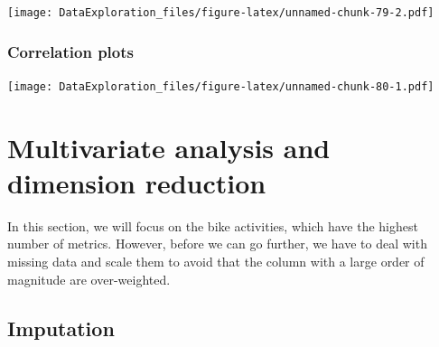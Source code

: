 \documentclass[
]{book}
\newenvironment{Shaded}{\begin{snugshade}}{\end{snugshade}}
\newcommand{\CommentTok}[1]{\textcolor[rgb]{0.56,0.35,0.01}{\textit{#1}}}
\newcommand{\DataTypeTok}[1]{\textcolor[rgb]{0.13,0.29,0.53}{#1}}
\newcommand{\KeywordTok}[1]{\textcolor[rgb]{0.13,0.29,0.53}{\textbf{#1}}}
\newcommand{\NormalTok}[1]{#1}
\newcommand{\OperatorTok}[1]{\textcolor[rgb]{0.81,0.36,0.00}{\textbf{#1}}}
\newcommand{\StringTok}[1]{\textcolor[rgb]{0.31,0.60,0.02}{#1}}
\begin{document}
\begin{Shaded}
\end{Shaded}

\texttt{[image: DataExploration\_files/figure-latex/unnamed-chunk-79-2.pdf]}

\hypertarget{correlation-plots}{%
\subsubsection{Correlation plots}\label{correlation-plots}}

\begin{Shaded}
\end{Shaded}

\texttt{[image: DataExploration\_files/figure-latex/unnamed-chunk-80-1.pdf]}

\hypertarget{multivariate-analysis-and-dimension-reduction}{%
\section{Multivariate analysis and dimension reduction}\label{multivariate-analysis-and-dimension-reduction}}

In this section, we will focus on the bike activities, which have the highest number of metrics. However, before we can go further, we have to deal with missing data and scale them to avoid that the column with a large order of magnitude are over-weighted.

\hypertarget{imputation}{%
\subsection{Imputation}\label{imputation}}
\end{document}
